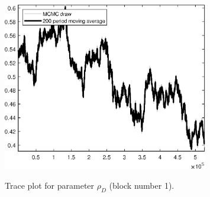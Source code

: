 \begin{figure}[H]
\centering
  \includegraphics[width=0.8\textwidth]{BRS_growth_KPR/graphs/TracePlot_rho_D_blck_1}\\
    \caption{Trace plot for parameter ${\rho_D}$ (block number 1).}
\end{figure}
